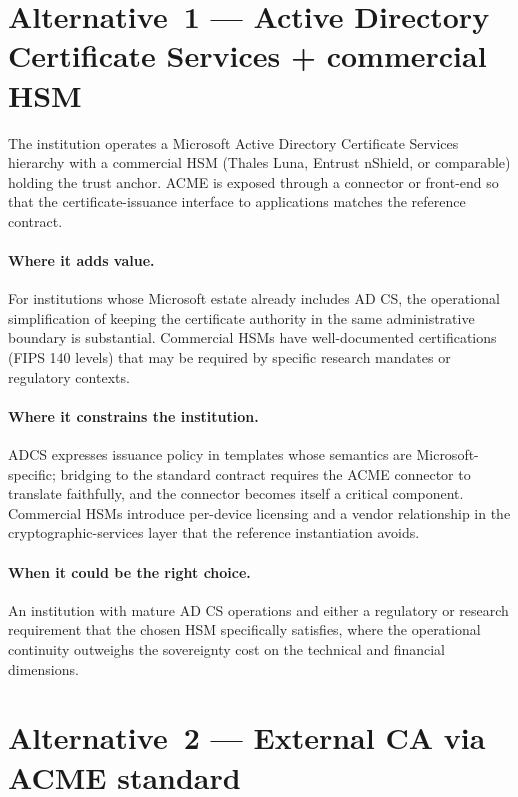 \section{Alternative~1 --- Active Directory Certificate Services + commercial HSM}
\label{sec:cr-alt1}

\begin{alternativebox}[AD CS]
\noindent The institution operates a Microsoft Active Directory
Certificate Services hierarchy with a commercial HSM (Thales
Luna, Entrust nShield, or comparable) holding the trust anchor.
ACME is exposed through a connector or front-end so that the
certificate-issuance interface to applications matches the
reference contract.
\end{alternativebox}

\paragraph{Where it adds value.} For institutions whose Microsoft
estate already includes AD CS, the operational simplification of
keeping the certificate authority in the same administrative
boundary is substantial. Commercial HSMs have well-documented
certifications (FIPS 140 levels) that may be required by specific
research mandates or regulatory contexts.

\paragraph{Where it constrains the institution.} ADCS expresses
issuance policy in templates whose semantics are
Microsoft-specific; bridging to the standard contract requires the
ACME connector to translate faithfully, and the connector becomes
itself a critical component. Commercial HSMs introduce per-device
licensing and a vendor relationship in the cryptographic-services
layer that the reference instantiation avoids.

\paragraph{When it could be the right choice.} An institution with
mature AD CS operations and either a regulatory or research
requirement that the chosen HSM specifically satisfies, where the
operational continuity outweighs the sovereignty cost on the
technical and financial dimensions.

\section{Alternative~2 --- External CA via ACME standard}
\label{sec:cr-alt2}

